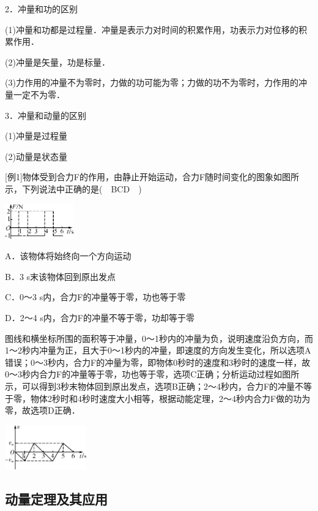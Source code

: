 2．冲量和功的区别

(1)冲量和功都是过程量．冲量是表示力对时间的积累作用，功表示力对位移的积累作用．

(2)冲量是矢量，功是标量．

(3)力作用的冲量不为零时，力做的功可能为零；力做的功不为零时，力作用的冲量一定不为零．

3．冲量和动量的区别

(1)冲量是过程量

(2)动量是状态量

{[}例1{]}物体受到合力F的作用，由静止开始运动，合力F随时间变化的图象如图所示，下列说法中正确的是(　BCD　)

\begin{center}\includegraphics[width=1.17014in,height=0.59444in]{media/image248.png}\end{center}

A．该物体将始终向一个方向运动

B．3 s末该物体回到原出发点

C．0～3 s内，合力F的冲量等于零，功也等于零

D．2～4 s内，合力F的冲量不等于零，功却等于零
\begin{solution}
	图线和横坐标所围的面积等于冲量，0～1秒内的冲量为负，说明速度沿负方向，而1～2秒内冲量为正，且大于0～1秒内的冲量，即速度的方向发生变化，所以选项A错误；0～3秒内，合力F的冲量为零，即物体0秒时的速度和3秒时的速度一样，故0～3秒内合力F的冲量等于零，功也等于零，选项C正确；分析运动过程如图所示，可以得到3秒末物体回到原出发点，选项B正确；2～4秒内，合力F的冲量不等于零，物体2秒时和4秒时速度大小相等，根据动能定理，2～4秒内合力F做的功为零，故选项D正确．
\end{solution}

\begin{center}\includegraphics[width=1.38681in,height=0.75486in]{media/image249.png}\end{center}
\newpage
\subsection{动量定理及其应用}

